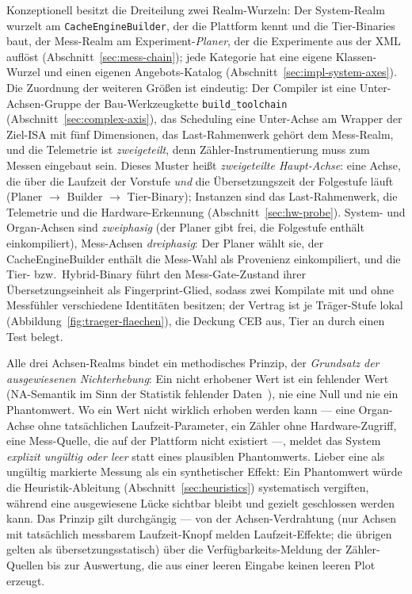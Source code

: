 \begin{nurkurz}
Konzeptionell besitzt die Dreiteilung zwei Realm-Wurzeln: Der System-Realm wurzelt am
\texttt{CacheEngineBuilder}, der die Plattform kennt und die Tier-Binaries baut, der Mess-Realm am
Experiment-\emph{Planer}, der die Experimente aus der XML auflöst (Abschnitt~\ref{sec:mess-chain}); jede
Kategorie hat eine eigene Klassen-Wurzel und einen eigenen Angebots-Katalog
(Abschnitt~\ref{sec:impl-system-axes}). Die Zuordnung der weiteren Größen ist eindeutig: Der Compiler ist eine
Unter-Achsen-Gruppe der Bau-Werkzeugkette \texttt{build\_toolchain} (Abschnitt~\ref{sec:complex-axis}), das
Scheduling eine Unter-Achse am Wrapper der Ziel-ISA mit fünf Dimensionen, das Last-Rahmenwerk gehört dem
Mess-Realm, und die Telemetrie ist \emph{zweigeteilt}, denn Zähler-Instrumentierung muss zum Messen eingebaut
sein. Dieses Muster heißt \emph{zweigeteilte Haupt-Achse}: eine Achse, die über die Laufzeit der Vorstufe
\emph{und} die Übersetzungszeit der Folgestufe läuft (Planer $\to$ Builder $\to$ Tier-Binary); Instanzen sind
das Last-Rahmenwerk, die Telemetrie und die Hardware-Erkennung (Abschnitt~\ref{sec:hw-probe}). System- und
Organ-Achsen sind \emph{zweiphasig} (der Planer gibt frei, die Folgestufe enthält einkompiliert), Mess-Achsen
\emph{dreiphasig}: Der Planer wählt sie, der CacheEngineBuilder enthält die Mess-Wahl als Provenienz
einkompiliert, und die Tier- bzw.\ Hybrid-Binary führt den Mess-Gate-Zustand ihrer Übersetzungseinheit als
Fingerprint-Glied, sodass zwei Kompilate mit und ohne Messfühler verschiedene Identitäten besitzen; der Vertrag
ist je Träger-Stufe lokal (Abbildung~\ref{fig:traeger-flaechen}), die Deckung CEB aus, Tier an durch einen Test
belegt.
\end{nurkurz}

Alle drei Achsen-Realms bindet ein methodisches Prinzip, der \emph{Grundsatz der ausgewiesenen
Nichterhebung}: Ein nicht erhobener Wert ist ein fehlender Wert (NA-Semantik im Sinn der Statistik
fehlender Daten~\cite{rubin1976missing}), nie eine Null und nie ein Phantomwert. Wo ein Wert nicht
wirklich erhoben werden kann --- eine Organ-Achse ohne tatsächlichen Laufzeit-Parameter, ein Zähler ohne
Hardware-Zugriff, eine Mess-Quelle, die auf der Plattform nicht existiert ---, meldet das System
\emph{explizit ungültig oder leer} statt eines plausiblen Phantomwerts. Lieber eine als ungültig
markierte Messung als ein synthetischer Effekt: Ein Phantomwert würde die Heuristik-Ableitung
(Abschnitt~\ref{sec:heuristics}) systematisch vergiften, während eine ausgewiesene Lücke sichtbar bleibt
und gezielt geschlossen werden kann. Das Prinzip gilt durchgängig --- von der Achsen-Verdrahtung (nur
Achsen mit tatsächlich messbarem Laufzeit-Knopf melden Laufzeit-Effekte; die übrigen gelten als
übersetzungsstatisch) über die Verfügbarkeits-Meldung der Zähler-Quellen bis zur Auswertung, die aus
einer leeren Eingabe keinen leeren Plot erzeugt.

